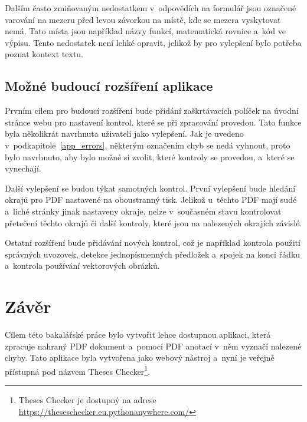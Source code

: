 Dalším často zmiňovaným nedostatkem v~odpovědích na formulář jsou označené
varování na mezeru před levou závorkou na místě, kde se mezera vyskytovat
nemá. Tato místa jsou například názvy funkcí, matematická rovnice a~kód
ve výpisu. Tento nedostatek není lehké opravit, jelikož by pro vylepšení
bylo potřeba poznat kontext textu.



\section{Možné budoucí rozšíření aplikace}
Prvním cílem pro budoucí rozšíření bude přidání zaškrtávacích políček na úvodní
stránce webu pro nastavení kontrol, které se při zpracování provedou. Tato funkce
byla několikrát navrhnuta uživateli jako vylepšení. Jak je uvedeno
v~podkapitole~\ref{app_errors}, některým označením chyb se nedá vyhnout, proto 
bylo navrhnuto, aby bylo možné si zvolit, které kontroly se provedou, a~které se
vynechají.

Další vylepšení se budou týkat samotných kontrol. První vylepšení bude hledání
okrajů pro PDF nastavené na oboustranný tisk. Jelikož u~těchto PDF mají sudé
a~liché stránky jinak nastaveny okraje, nelze v~současném stavu kontrolovat 
přetečení těchto okrajů či další kontroly, které jsou na nalezených okrajích
závislé.

Ostatní rozšíření bude přidávání nových kontrol, což je například  kontrola
použití správných uvozovek, detekce jednopísmenných předložek a~spojek na
konci řádku a~kontrola používání vektorových obrázků.







\chapter{Závěr}
Cílem této bakalářské práce bylo vytvořit lehce dostupnou aplikaci, která zpracuje
nahraný PDF dokument a~pomocí PDF anotací v~něm vyznačí nalezené chyby. Tato
aplikace byla vytvořena jako webový nástroj a~nyní je veřejně
přístupná pod názvem Theses Checker\footnote{Theses Checker je dostupný na adrese
\href{https://theseschecker.eu.pythonanywhere.com/}{https://theseschecker.eu.pythonanywhere.com/}}.

